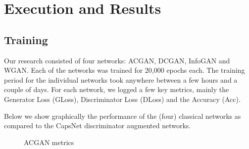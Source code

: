 \chapter{Execution and Results}\label{ch:execandresults}


\section{Training} %
\label{sec:training}

Our research consisted of four networks: ACGAN, DCGAN, InfoGAN and WGAN. Each of the networks was trained for 20,000 epochs each. The training period for the individual networks took anywhere between a few hours and a couple of days. For each network, we logged a few key metrics, mainly the Generator Loss (GLoss), Discriminator Loss (DLoss) and the Accuracy (Acc). 
\par\bigskip
Below we show graphically the performance of the (four) classical networks as compared to the CapsNet discriminator augmented networks.

\begin{figure}[H]
    \centering
    \qquad
    \caption{ACGAN metrics}%
    \label{fig:acgan}%
\end{figure}

